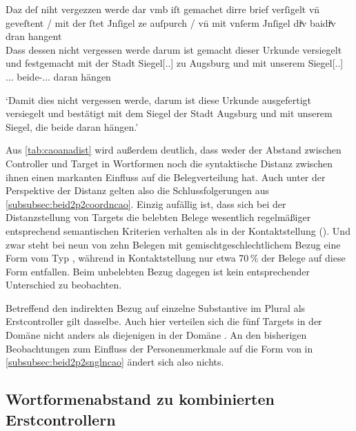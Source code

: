 \begin{exe}
\ex\label{ex:insigel}
	\gll Daz deſ niht vergezzen werde {dar vmb} iſt gemachet dirre brief
			verſigelt vn̄ geveſtent / mit der ſtet Jnſigel ze auſpurch
			/ vn̄ mit vnſerm Jnſigel diͤv
			baidiͤv dran hangent \\			
		Dass dessen nicht vergessen werde darum ist gemacht dieser Urkunde
			versiegelt und festgemacht {} mit der Stadt Siegel[\Dat.\Sg.\NeutI]
			zu Augsburg {} und mit unserem Siegel[\Dat.\Sg.\NeutI]
			\Rel.\Nom.\Pl.\NeutI{} beide-\Nom.\Pl.\NeutI.\St{} daran hängen \\
	\begin{taggedline}{\parencites(Augsburg, 1298)[\pno~3056, 304.15--17]{cao4}}
		`Damit dies nicht vergessen werde, darum ist diese Urkunde
		ausgefertigt versiegelt und bestätigt mit dem Siegel der Stadt
		Augsburg und mit unserem Siegel, die beide daran hängen.'
	\end{taggedline}
\end{exe}

Aus \cref{tab:caoanadist} wird außerdem deutlich, dass weder der Abstand
zwischen Controller und Target in Wortformen noch die syntaktische Distanz
zwischen ihnen einen markanten Einfluss auf die Belegverteilung hat. Auch unter
der Perspektive der Distanz gelten also die Schlussfolgerungen aus
\cref{subsubsec:beid2p2coordncao}. Einzig aufällig ist, dass sich bei der
Distanzstellung von Targets die belebten Belege wesentlich regelmäßiger
entsprechend semantischen Kriterien verhalten als in der Kontaktstellung
(). Und zwar steht bei neun von zehn Belegen mit
gemischtgeschlechtlichem Bezug eine Form vom Typ , während in
Kontaktstellung nur etwa 70\,\% der Belege auf diese Form entfallen. Beim
unbelebten Bezug dagegen ist kein entsprechender Unterschied zu beobachten.

Betreffend den indirekten Bezug auf einzelne Substantive im Plural als
Erstcontroller gilt dasselbe. Auch hier verteilen sich die fünf Targets in der
Domäne  nicht anders als diejenigen in der Domäne
. An den bisherigen Beobachtungen zum
Einfluss der Personenmerkmale auf die Form von  in
\cref{subsubsec:beid2p2snglncao} ändert sich also nichts.

\subsection{Wortformenabstand zu kombinierten Erstcontrollern}

